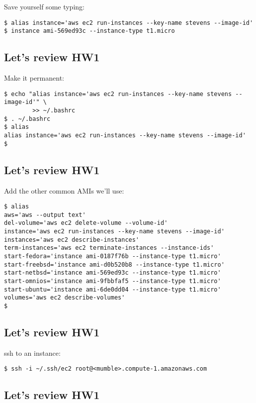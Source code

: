 \documentclass[xga]{xdvislides}
\begin{document}
Save yourself some typing:
\begin{verbatim}
$ alias instance='aws ec2 run-instances --key-name stevens --image-id'
$ instance ami-569ed93c --instance-type t1.micro
\end{verbatim}

\subsection{Let's review HW1}
\vspace{.5in}

Make it permanent:
\begin{verbatim}
$ echo "alias instance='aws ec2 run-instances --key-name stevens --image-id'" \
        >> ~/.bashrc
$ . ~/.bashrc
$ alias
alias instance='aws ec2 run-instances --key-name stevens --image-id'
$ 
\end{verbatim}

\subsection{Let's review HW1}
\vspace{.5in}

Add the other common AMIs we'll use:
\begin{verbatim}
$ alias
aws='aws --output text'
del-volume='aws ec2 delete-volume --volume-id'
instance='aws ec2 run-instances --key-name stevens --image-id'
instances='aws ec2 describe-instances'
term-instances='aws ec2 terminate-instances --instance-ids'
start-fedora='instance ami-0187f76b --instance-type t1.micro'
start-freebsd='instance ami-d0b520b8 --instance-type t1.micro'
start-netbsd='instance ami-569ed93c --instance-type t1.micro'
start-omnios='instance ami-9fbbfaf5 --instance-type t1.micro'
start-ubuntu='instance ami-6de0dd04 --instance-type t1.micro'
volumes='aws ec2 describe-volumes'
$ 
\end{verbatim}


\subsection{Let's review HW1}
\vspace{.5in}

ssh to an instance:
\begin{verbatim}
$ ssh -i ~/.ssh/ec2 root@<mumble>.compute-1.amazonaws.com
\end{verbatim}

\subsection{Let's review HW1}
\vspace{.5in}
\end{document}
